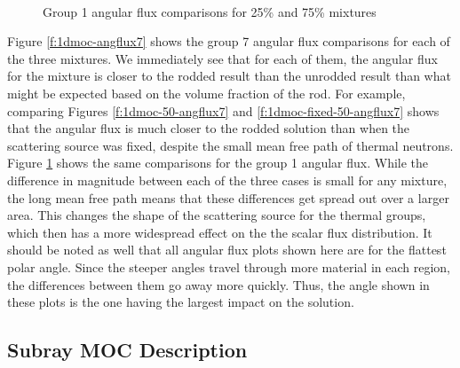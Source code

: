 \begin{figure}[H]
    \centering
    \hfill
    ~
    \caption{Group 1 angular flux comparisons for 25\% and 75\% mixtures}\label{f:1dmoc-angflux1}
\end{figure}


Figure \ref{f:1dmoc-angflux7} shows the group 7 angular flux comparisons for each of the three mixtures.  We immediately see that for each of them, the angular flux for the mixture is closer to the rodded result than the unrodded result than what might be expected based on the volume fraction of the rod.  For example, comparing Figures \ref{f:1dmoc-50-angflux7} and \ref{f:1dmoc-fixed-50-angflux7} shows that the angular flux is much closer to the rodded solution than when the scattering source was fixed, despite the small mean free path of thermal neutrons.  Figure \ref{f:1dmoc-angflux1} shows the same comparisons for the group 1 angular flux.  While the difference in magnitude between each of the three cases is small for any mixture, the long mean free path means that these differences get spread out over a larger area.  This changes the shape of the scattering source for the thermal groups, which then has a more widespread effect on the the scalar flux distribution.  It should be noted as well that all angular flux plots shown here are for the flattest polar angle.  Since the steeper angles travel through more material in each region, the differences between them go away more quickly.  Thus, the angle shown in these plots is the one having the largest impact on the solution.

\subsection{Subray MOC Description}